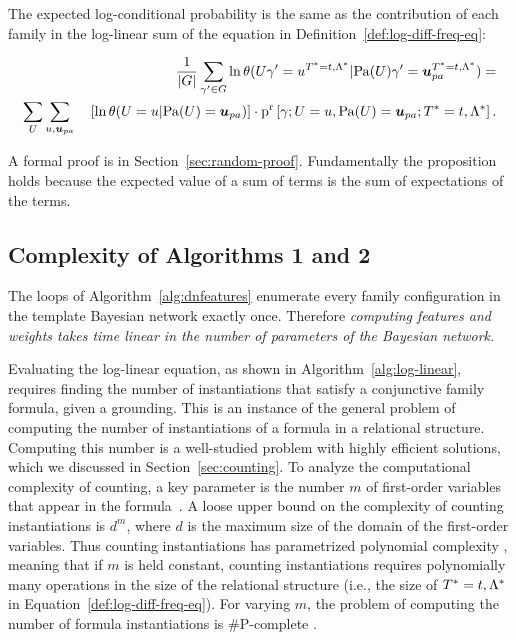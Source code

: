 \documentclass[runningheads,a4paper]{llncs}
\renewcommand{\Qconj}{\Appendterm{\FG{\TT} = \TV} {\QC}} %
\begin{document}
\begin{proposition} \label{prop:random}
The expected log-conditional probability is the same as the contribution of each family in the log-linear sum of the equation in Definition~\ref{def:log-diff-freq-eq}:

\begin{align*}
\frac{1}{|G|} \sum_{\grounding' \in G} \ln \cprob{\UT \grounding' = \UV^{\Qconj}}{\Pa{\UT} \grounding' = \Prange{\UT}^{\Qconj}} 
= 
\\
 \sum_{\UT} \sum_{\UV,\Prange{\UT}}   \quad \left[ \ln \cprob{\UT = \UV}{\Pa{\UT} = \Prange{\UT}} \right] 
 \cdot 
\Relfreq{\Appendterm{\grounding;\UT  = \UV} {\Pa{\UT} = \Prange{\UT}}} {\Qconj}.
\end{align*}

\end{proposition} 

A formal proof is in Section~\ref{sec:random-proof}. Fundamentally the proposition holds because the expected value of a sum of terms is the sum of expectations of the terms.





\subsection{Complexity of Algorithms 1 and 2} \label{sec:complexity}
The loops of Algorithm~\ref{alg:dnfeatures} enumerate every family configuration in the template Bayesian network exactly once. Therefore {\em computing features and weights takes time linear in the number of parameters of the Bayesian network.} 

Evaluating the log-linear equation, as shown in Algorithm~\ref{alg:log-linear}, requires finding the number of instantiations that satisfy a conjunctive family formula, given a grounding. This is an instance of the general problem of computing the number of instantiations of a formula in a relational structure. Computing this number is a well-studied problem  with highly efficient solutions, which we discussed in Section~\ref{sec:counting}. To analyze the computational complexity of counting,  a key parameter is the number $m$ of first-order variables that appear in the formula~\cite{Vardi1995}. A loose upper bound on the complexity of counting instantiations is $d^{m}$, where $d$ is the maximum size of the domain of the first-order variables. Thus counting instantiations has parametrized polynomial complexity \cite{Flum2006}, meaning that if $m$ is held constant, counting instantiations requires polynomially many operations in the size of the relational structure (i.e., the size of $\Qconj$ in Equation~\eqref{def:log-diff-freq-eq}). For varying $m$, the problem of computing the number of formula instantiations is \#P-complete \cite[Prop.12.4]{Domingos2007}.
\end{document}
